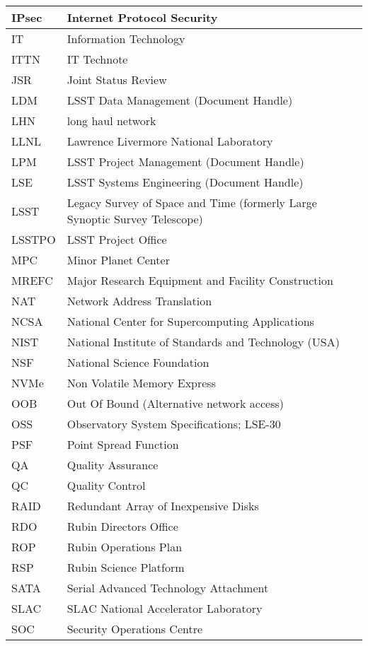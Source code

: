 \begin{longtable}{p{}p{}}
IPsec & Internet Protocol Security \\\hline
IT & Information Technology \\\hline
ITTN & IT Technote \\\hline
JSR & Joint Status Review \\\hline
LDM & LSST Data Management (Document Handle) \\\hline
LHN & long haul network \\\hline
LLNL & Lawrence Livermore National Laboratory \\\hline
LPM & LSST Project Management (Document Handle) \\\hline
LSE & LSST Systems Engineering (Document Handle) \\\hline
LSST & Legacy Survey of Space and Time (formerly Large Synoptic Survey Telescope) \\\hline
LSSTPO & LSST Project Office \\\hline
MPC & Minor Planet Center \\\hline
MREFC & Major Research Equipment and Facility Construction \\\hline
NAT & Network Address Translation \\\hline
NCSA & National Center for Supercomputing Applications \\\hline
NIST & National Institute of Standards and Technology (USA) \\\hline
NSF & National Science Foundation \\\hline
NVMe & Non Volatile Memory Express \\\hline
OOB & Out Of Bound (Alternative network access) \\\hline
OSS & Observatory System Specifications; LSE-30 \\\hline
PSF & Point Spread Function \\\hline
QA & Quality Assurance \\\hline
QC & Quality Control \\\hline
RAID & Redundant Array of Inexpensive Disks \\\hline
RDO & Rubin Directors Office \\\hline
ROP & Rubin Operations Plan \\\hline
RSP & Rubin Science Platform \\\hline
SATA & Serial Advanced Technology Attachment \\\hline
SLAC & SLAC National Accelerator Laboratory \\\hline
SOC & Security Operations Centre \\\hline

\end{longtable}
